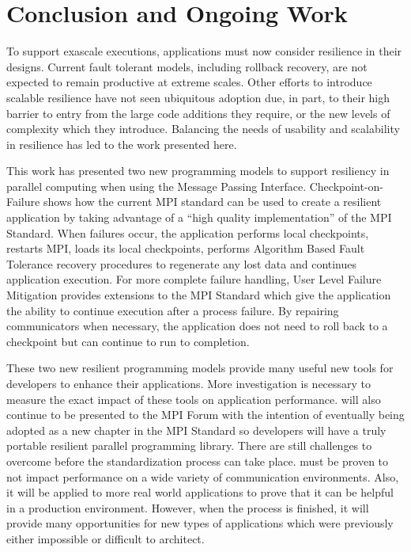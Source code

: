 \section{Conclusion and Ongoing Work}\label{sect:conclusion}

To support exascale executions, applications must now consider resilience in
their designs. Current fault tolerant models, including rollback recovery, are
not expected to remain productive at extreme scales. Other efforts to introduce
scalable resilience have not seen ubiquitous adoption due, in part, to their
high barrier to entry from the large code additions they require, or the new
levels of complexity which they introduce. Balancing the needs of usability and
scalability in resilience has led to the work presented here.

This work has presented two new programming models to support resiliency in
parallel computing when using the Message Passing Interface.
Checkpoint-on-Failure shows how the current MPI standard can be used to create a
resilient application by taking advantage of a ``high quality implementation'' of
the MPI Standard. When failures occur, the application performs local
checkpoints, restarts MPI, loads its local checkpoints, performs Algorithm Based
Fault Tolerance recovery procedures to regenerate any lost data and continues
application execution. For more complete failure handling, User Level Failure
Mitigation provides extensions to the MPI Standard which give the application
the ability to continue execution after a process failure. By repairing
communicators when necessary, the application does not need to roll back to a
checkpoint but can continue to run to completion.

These two new resilient programming models provide many useful new tools for
developers to enhance their applications. More investigation is necessary to
measure the exact impact of these tools on application performance. \ulfm will
also continue to be presented to the MPI Forum with the intention of eventually
being adopted as a new chapter in the MPI Standard so developers will have a
truly portable resilient parallel programming library. There are still
challenges to overcome before the standardization process can take place. \ulfm
must be proven to not impact performance on a wide variety of communication
environments. Also, it will be applied to more real world applications to prove
that it can be helpful in a production environment. However, when the process is
finished, it will provide many opportunities for new types of applications which
were previously either impossible or difficult to architect.
